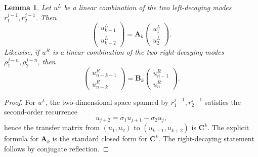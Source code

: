 \documentclass[11pt]{article}
\newtheorem{lemma}[theorem]{Lemma}
\begin{document}
\begin{lemma}\label{lem:block-propagators}
Let \(u^L\) be a linear combination of the two left-decaying modes \(r_1^{j-1},r_2^{j-1}\).
Then
\[
\begin{pmatrix}
u_{k+1}^L\\
u_{k+2}^L
\end{pmatrix}
=
\mathbf A_k
\begin{pmatrix}
u_1^L\\
u_2^L
\end{pmatrix}.
\]
Likewise, if \(u^R\) is a linear combination of the two right-decaying modes
\(\rho_1^{j-n},\rho_2^{j-n}\), then
\[
\begin{pmatrix}
u_{n-k-1}^R\\
u_{n-k}^R
\end{pmatrix}
=
\mathbf B_k
\begin{pmatrix}
u_{n-1}^R\\
u_n^R
\end{pmatrix}.
\]
\end{lemma}

\begin{proof}
For \(u^L\), the two-dimensional space spanned by \(r_1^{j-1},r_2^{j-1}\) satisfies the second-order
recurrence
\[
u_{j+2}=\sigma_1 u_{j+1}-\sigma_2 u_j,
\]
hence the transfer matrix from \((u_1,u_2)\) to \((u_{k+1},u_{k+2})\) is \(\mathbf C^k\).
The explicit formula for \(\mathbf A_k\) is the standard closed form for \(\mathbf C^k\).
The right-decaying statement follows by conjugate reflection.
\end{proof}
\end{document}
